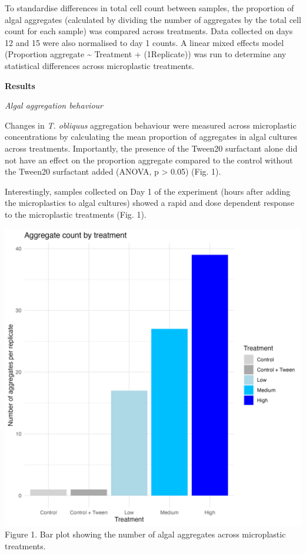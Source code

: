 \documentclass[
]{article}
\begin{document}
To standardise differences in total cell count between samples, the
proportion of algal aggregates (calculated by dividing the number of
aggregates by the total cell count for each sample) was compared across
treatments. Data collected on days 12 and 15 were also normalised to day
1 counts. A linear mixed effects model (Proportion aggregate
\textasciitilde{} Treatment + (1\textbar Replicate)) was run to
determine any statistical differences across microplastic treatments.

\textbf{Results}

\emph{Algal aggregation behaviour}

Changes in \emph{T. obliquus} aggregation behaviour were measured across
microplastic concentrations by calculating the mean proportion of
aggregates in algal cultures across treatments. Importantly, the
presence of the Tween20 surfactant alone did not have an effect on the
proportion aggregate compared to the control without the Tween20
surfactant added (ANOVA, p \textgreater{} 0.05) (Fig. 1).

Interestingly, samples collected on Day 1 of the experiment (hours after
adding the microplastics to algal cultures) showed a rapid and dose
dependent response to the microplastic treatments (Fig. 1).

\includegraphics{03_figures/D1_agcount.png} Figure 1. Bar plot showing
the number of algal aggregates across microplastic treatments.
\end{document}
